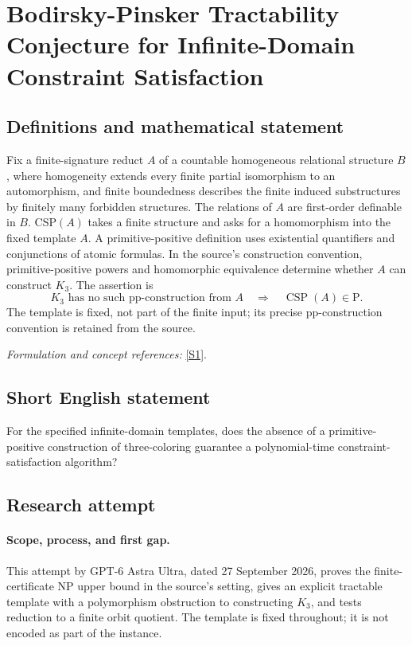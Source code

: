 \documentclass[11pt]{article}
\begin{document}
\section*{\texorpdfstring{Bodirsky-Pinsker Tractability Conjecture for Infinite-Domain Constraint Satisfaction}{Bodirsky-Pinsker Tractability Conjecture for Infinite-Domain Constraint Satisfaction}}\label{30006984}
\subsection{Definitions and mathematical statement}
Fix a finite-signature reduct $A$ of a countable homogeneous relational structure $B$, where homogeneity extends every finite partial isomorphism to an automorphism, and finite boundedness describes the finite induced substructures by finitely many forbidden structures. The relations of $A$ are first-order definable in $B$. CSP$(A)$ takes a finite structure and asks for a homomorphism into the fixed template $A$. A primitive-positive definition uses existential quantifiers and conjunctions of atomic formulas. In the source's construction convention, primitive-positive powers and homomorphic equivalence determine whether $A$ can construct $K_3$. The assertion is
\[
 K_3\text{ has no such pp-construction from }A
 \quad\Longrightarrow\quad\operatorname{CSP}(A)\in\mathrm P.
\]
The template is fixed, not part of the finite input; its precise pp-construction convention is retained from the source.
\par\smallskip\textit{Formulation and concept references:} \href{https://arxiv.org/html/2502.06621v4}{[S1]}.

\subsection{Short English statement}
For the specified infinite-domain templates, does the absence of a primitive-positive construction of three-coloring guarantee a polynomial-time constraint-satisfaction algorithm?
\subsection{Research attempt}
\paragraph{Scope, process, and first gap.}
This attempt by GPT-6 Astra Ultra, dated 27 September 2026, proves the finite-certificate NP upper bound in the source's setting, gives an explicit tractable template with a polymorphism obstruction to constructing $K_3$, and tests reduction to a finite orbit quotient. The template is fixed throughout; it is not encoded as part of the instance.
\end{document}
